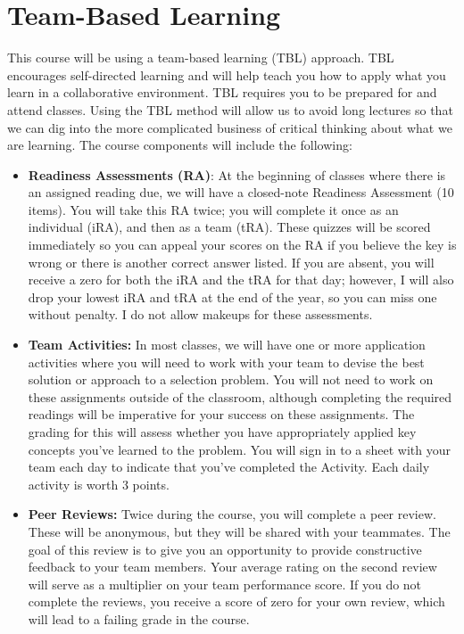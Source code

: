\documentclass[11pt]{article}
\begin{document}
\section*{Team-Based Learning}
This course will be using a team-based learning (TBL) approach. TBL encourages self-directed learning and will help teach you how to apply what you learn in a collaborative environment. TBL requires you to be prepared for and attend classes. Using the TBL method will allow us to avoid long lectures so that we can dig into the more complicated business of critical thinking about what we are learning. The course components will include the following:
\begin{itemize}
\item \textbf{Readiness Assessments (RA)}: At the beginning of classes where there is an assigned reading due, we will have a closed-note Readiness Assessment (10 items). You will take this RA twice; you will complete it once as an individual (iRA), and then as a team (tRA). These quizzes will be scored immediately so you can appeal your scores on the RA if you believe the key is wrong or there is another correct answer listed. If you are absent, you will receive a zero for both the iRA and the tRA for that day; however, I will also drop your lowest iRA and tRA at the end of the year, so you can miss one without penalty. I do not allow makeups for these assessments. 

\item \textbf{Team Activities:} In most classes, we will have one or more application activities where you will need to work with your team to devise the best solution or approach to a selection problem. You will not need to work on these assignments outside of the classroom, although completing the required readings will be imperative for your success on these assignments. The grading for this will assess whether you have appropriately applied key concepts you’ve learned to the problem. You will sign in to a sheet with your team each day to indicate that you've completed the Activity. Each daily activity is worth 3 points.

\item \textbf{Peer Reviews:} Twice during the course, you will complete a peer review. These will be anonymous, but they will be shared with your teammates. The goal of this review is to give you an opportunity to provide constructive feedback to your team members. Your average rating on the second review will serve as a multiplier on your team performance score. If you do not complete the reviews, you receive a score of zero for your own review, which will lead to a failing grade in the course.
\end{itemize}
\end{document}
